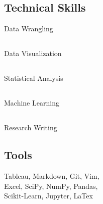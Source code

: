 \documentclass[]{sahana}
\begin{document}
\begin{minipage}[t]{0.33\textwidth}
\subsection{}\vspace{-12pt}
\vspace{6pt}
\subsection{Technical Skills}
Data Wrangling \hfill{}\hspace{40pt}
\subsection{}\vspace{-12pt}
Data Visualization \hfill{}\hspace{40pt}
\subsection{}\vspace{-12pt}
Statistical Analysis \hfill{}\hspace{40pt}
\subsection{}\vspace{-12pt}
Machine Learning \hfill{}\hspace{40pt}
\subsection{}\vspace{-12pt}
Research Writing \hfill{}\hspace{40pt}
\subsection{}\vspace{-12pt}
\vspace{6pt}
\subsection{Tools}
Tableau, Markdown, Git, Vim,\\ Excel, SciPy, NumPy, Pandas, \\ Scikit-Learn, Jupyter, LaTex


\sectionsep

%
%

\end{minipage} 
\end{document}
